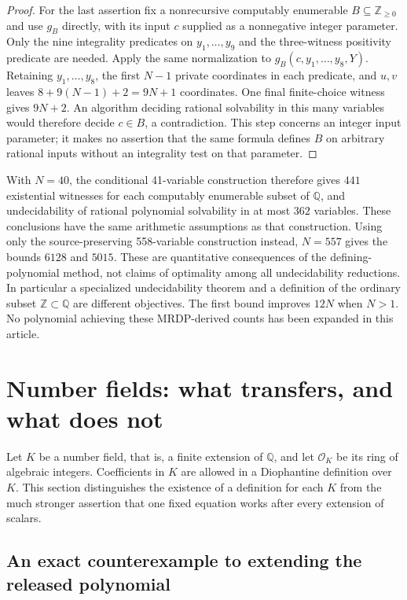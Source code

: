 \documentclass[11pt]{article}
\theoremstyle{definition}
\newcommand{\Q}{\mathbb Q}
\newcommand{\Z}{\mathbb Z}
\begin{document}
\begin{proof}
For the last assertion fix a nonrecursive computably enumerable
$B\subseteq\mathbb Z_{\ge0}$ and use $g_B$ directly, with its
input $c$ supplied as a nonnegative integer parameter. Only the nine
integrality predicates on $y_1,\ldots,y_9$ and the three-witness
positivity predicate are needed. Apply the same normalization to
$g_B(c,y_1,\ldots,y_8,Y)$. Retaining $y_1,\ldots,y_8$, the first
$N-1$ private coordinates in each predicate, and $u,v$ leaves
$8+9(N-1)+2=9N+1$ coordinates. One final finite-choice witness
gives $9N+2$. An algorithm deciding rational solvability in this
many variables would
therefore decide $c\in B$, a contradiction. This step concerns an
integer input parameter; it makes no assertion that the same formula
defines $B$ on arbitrary rational inputs without an integrality test
on that parameter.
\end{proof}

With $N=40$, the conditional 41-variable construction therefore gives
$441$ existential witnesses for each computably enumerable subset of
$\Q$, and undecidability of rational polynomial solvability in at most
$362$ variables. These conclusions have the same arithmetic assumptions
as that construction. Using only the source-preserving 558-variable
construction instead, $N=557$ gives the bounds $6128$ and $5015$.
These are quantitative consequences of the defining-polynomial method,
not claims of optimality among all undecidability reductions. In
particular a specialized undecidability theorem and a definition of the
ordinary subset $\Z\subset\Q$ are different objectives. The first
bound improves $12N$ when $N>1$. No polynomial achieving these
MRDP-derived counts has been expanded in this article.



\section{Number fields: what transfers, and what does not}
\label{sec:number-fields}

Let $K$ be a number field, that is, a finite extension of $\mathbb Q$, and let
$\mathcal O_K$ be its ring of algebraic integers.  Coefficients in $K$ are
allowed in a Diophantine definition over $K$.  This section distinguishes
the existence of a definition for each $K$ from the much stronger assertion
that one fixed equation works after every extension of scalars.

\subsection{An exact counterexample to extending the released polynomial}
\end{document}
